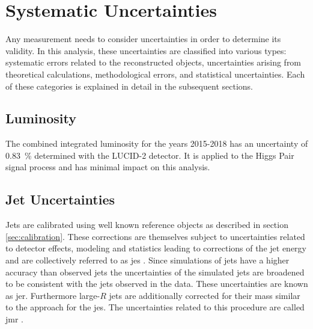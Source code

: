 \chapter{Systematic Uncertainties}
Any measurement needs to consider uncertainties in order to determine its validity. In this analysis, these uncertainties are classified into various types: systematic errors related to the reconstructed objects, uncertainties arising from theoretical calculations, methodological errors, and statistical uncertainties. Each of these categories is explained in detail in the subsequent sections.

\section{Luminosity}
The combined integrated luminosity for the years 2015-2018 has an uncertainty of \qty[]{0.83}{\percent} determined with the LUCID-2 detector. It is applied to the Higgs Pair signal process and has minimal impact on this analysis.

\section{Jet Uncertainties}
Jets are calibrated using well known reference objects as described in section \ref{sec:calibration}. These corrections are themselves subject to uncertainties related to detector effects, modeling and statistics leading to corrections of the jet energy and are collectively referred to as \ac{jes} \citep{atlas2021jet,Aaboud:2019aa}. Since simulations of jets have a higher accuracy than observed jets the uncertainties of the simulated jets are broadened to be consistent with the jets observed in the data. These uncertainties are known as \ac{jer}. Furthermore large-$R$ jets are additionally corrected for their mass similar to the approach for the \ac{jes}. The uncertainties related to this procedure are called \ac{jmr} \citep{ATLAS-CONF-2020-022}.

